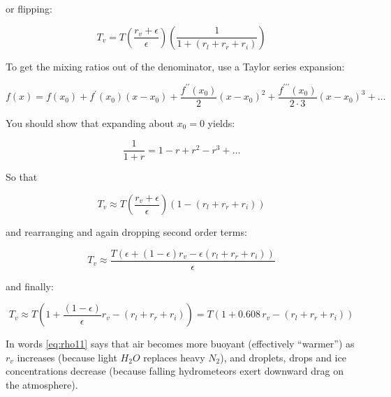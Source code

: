 \documentclass[12pt]{article}
\begin{document}
or flipping:

\begin{equation}
  \label{eq:rho8}
 T_v =  T \left ( \frac{r_v + \epsilon}{\epsilon} \right ) \left ( \frac{ 1  }{1 + (r_l + r_r + r_i)}
 \right )
\end{equation}

To get the mixing ratios out of the denominator, use a Taylor series expansion:

\begin{equation}
  \label{eq:taylor}
  f(x)  = f(x_0) + f^\prime(x_0)(x - x_0) + \frac{f^{\prime\prime}(x_0)}{2}(x-x_0)^2 +
            \frac{f^{\prime\prime\prime}(x_0)}{2\cdot3}(x-x_0)^3 + \ldots
\end{equation}

You should show that expanding about $x_0 = 0$ yields:

\begin{equation}
  \label{eq:expan}
\frac{1}{1 + r} = 1 - r + r^2 - r^3 + \ldots  
\end{equation}

So that


\begin{equation}
  \label{eq:rho9}
 T_v \approx  T \left ( \frac{r_v + \epsilon}{\epsilon} \right ) \left ( 1 - (r_l + r_r + r_i)
 \right )
\end{equation}

and rearranging and again dropping second order terms:

\begin{equation}
  \label{eq:rho10}
 T_v \approx   \frac{T (\epsilon + (1-\epsilon) r_v - \epsilon(r_l + r_r + r_i))}{\epsilon}
\end{equation}

and finally:

\begin{equation}
  \label{eq:rho11}
 T_v \approx   T \left ( 1 + \frac{( 1-\epsilon)}{\epsilon} r_v - (r_l + r_r + r_i) \right )
 = T \left ( 1 + 0.608\, r_v - (r_l + r_r + r_i) \right )
\end{equation}

In words \eqref{eq:rho11} says that air becomes more buoyant (effectively ``warmer'')
as $r_v$ increases (because light $H_2O$ replaces heavy $N_2$), and droplets,
drops and ice concentrations decrease (because falling hydrometeors exert downward
drag on the
atmosphere).
\end{document}
